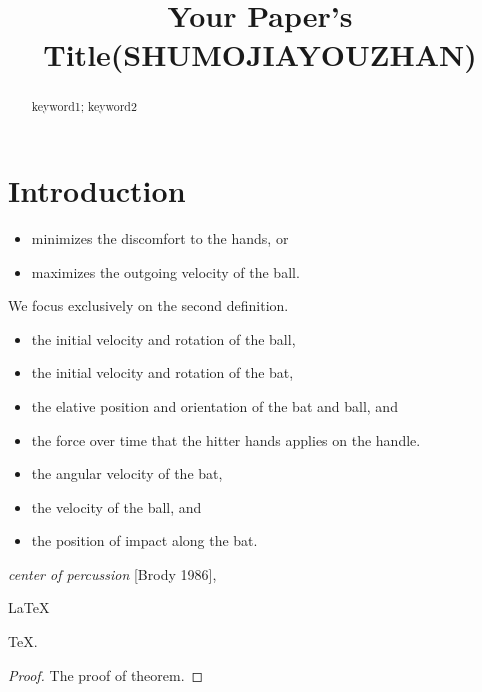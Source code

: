 \documentclass{mcmthesis}
\title{Your Paper's Title(SHUMOJIAYOUZHAN)}
\begin{document}
\begin{abstract}
\lipsum[1]

\begin{keywords}
keyword1; keyword2
\end{keywords}
\end{abstract}
\maketitle
 \tableofcontents
 \newpage



\section{Introduction}
\lipsum[2]
\begin{itemize}
\item minimizes the discomfort to the hands, or 
\item maximizes the outgoing velocity of the ball.
\end{itemize}
We focus exclusively on the second definition.
\begin{itemize}
\item the initial velocity and rotation of the ball,
\item the initial velocity and rotation of the bat,
\item the elative position and orientation of the bat and ball, and
\item the force over time that the hitter hands applies on the handle.
\end{itemize}
\lipsum[3]
\begin{itemize}
\item the angular velocity of the bat,
\item the velocity of the ball, and
\item the position of impact along the bat.
\end{itemize}
\lipsum[4]
\emph{center of percussion} [Brody 1986], \lipsum[5]
\begin{Theorem} \label{thm:latex}
\LaTeX
\end{Theorem}
\begin{Lemma} \label{thm:tex}
\TeX .
\end{Lemma}
\begin{proof}
The proof of theorem.
\end{proof}
\end{document}
